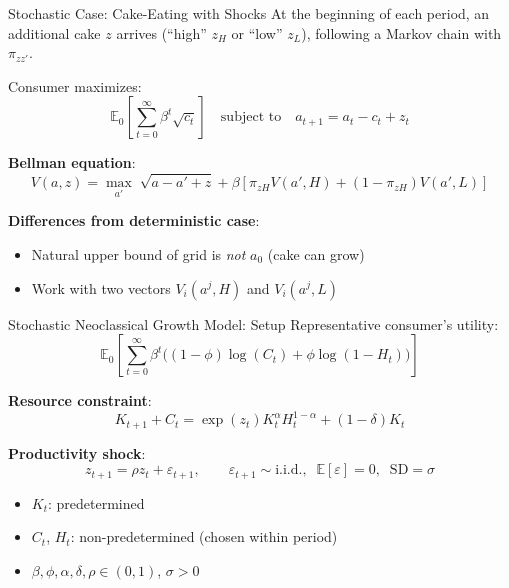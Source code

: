 \documentclass[blue]{beamer}
\newcommand{\E}{\mathbb{E}}
\begin{document}
\begin{frame}{Stochastic Case: Cake-Eating with Shocks}
	At the beginning of each period, an additional cake $z$ arrives (``high'' $z_H$ or ``low'' $z_L$), following a Markov chain with $\pi_{z z'}$.
	
	\bigskip
	Consumer maximizes:
	\[
	\E_0\!\left[\sum_{t=0}^\infty \beta^t \sqrt{c_t}\right] \quad \text{subject to} \quad a_{t+1} = a_t - c_t + z_t
	\]
	
	\bigskip
	\textbf{Bellman equation}:
	\[
	V(a, z) = \max_{a'}\; \sqrt{a - a' + z} + \beta[\pi_{zH} V(a', H) + (1 - \pi_{zH}) V(a', L)]
	\]
	
	\bigskip
	\textbf{Differences from deterministic case}:
	\begin{itemize}
		\item Natural upper bound of grid is \emph{not} $a_0$ (cake can grow)
		\item Work with two vectors $V_i(a^j, H)$ and $V_i(a^j, L)$
	\end{itemize}
\end{frame}

\begin{frame}{Stochastic Neoclassical Growth Model: Setup}
	Representative consumer's utility:
	\[
	\E_0\!\left[\sum_{t=0}^\infty \beta^t \bigl((1 - \phi) \log(C_t) + \phi \log(1 - H_t)\bigr)\right]
	\]
	
	\textbf{Resource constraint}:
	\[
	K_{t+1} + C_t = \exp(z_t) K_t^\alpha H_t^{1-\alpha} + (1 - \delta) K_t
	\]
	
	\textbf{Productivity shock}:
	\[
	z_{t+1} = \rho z_t + \varepsilon_{t+1}, \qquad \varepsilon_{t+1} \sim \text{i.i.d.}, \;\; \E[\varepsilon] = 0, \;\; \text{SD} = \sigma
	\]
	
	\begin{itemize}
		\item $K_t$: predetermined
		\item $C_t$, $H_t$: non-predetermined (chosen within period)
		\item $\beta, \phi, \alpha, \delta, \rho \in (0, 1)$, $\sigma > 0$
	\end{itemize}
\end{frame}
\end{document}
